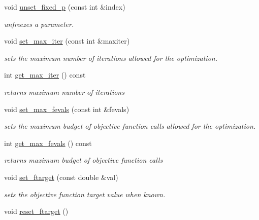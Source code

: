 \begin{DoxyCompactItemize}
void \hyperlink{classlibcmaes_1_1Parameters_a540a57691845698e79af120f16d27f2c}{unset\-\_\-fixed\-\_\-p} (const int \&index)
\begin{DoxyCompactList}\small\item\em unfreezes a parameter. \end{DoxyCompactList}\item 
void \hyperlink{classlibcmaes_1_1Parameters_acefab965b50d45c6609e4f3267785ace}{set\-\_\-max\-\_\-iter} (const int \&maxiter)
\begin{DoxyCompactList}\small\item\em sets the maximum number of iterations allowed for the optimization. \end{DoxyCompactList}\item 
int \hyperlink{classlibcmaes_1_1Parameters_a95b8ff475b28b2cbf89cd147ab09eeee}{get\-\_\-max\-\_\-iter} () const 
\begin{DoxyCompactList}\small\item\em returns maximum number of iterations \end{DoxyCompactList}\item 
void \hyperlink{classlibcmaes_1_1Parameters_aa924cb4c8ffee0d148b63f5c0b55b4ce}{set\-\_\-max\-\_\-fevals} (const int \&fevals)
\begin{DoxyCompactList}\small\item\em sets the maximum budget of objective function calls allowed for the optimization. \end{DoxyCompactList}\item 
int \hyperlink{classlibcmaes_1_1Parameters_af738c73caee922feff43ba29218ea8ad}{get\-\_\-max\-\_\-fevals} () const 
\begin{DoxyCompactList}\small\item\em returns maximum budget of objective function calls \end{DoxyCompactList}\item 
void \hyperlink{classlibcmaes_1_1Parameters_a6ace7e5d230fcf82c70ba2dd3a801f97}{set\-\_\-ftarget} (const double \&val)
\begin{DoxyCompactList}\small\item\em sets the objective function target value when known. \end{DoxyCompactList}\item 
\hypertarget{classlibcmaes_1_1Parameters_aec14ab6c39a12e347080fa7e0f2e7c9f}{void \hyperlink{classlibcmaes_1_1Parameters_aec14ab6c39a12e347080fa7e0f2e7c9f}{reset\-\_\-ftarget} ()}\label{classlibcmaes_1_1Parameters_aec14ab6c39a12e347080fa7e0f2e7c9f}


\end{DoxyCompactItemize}
